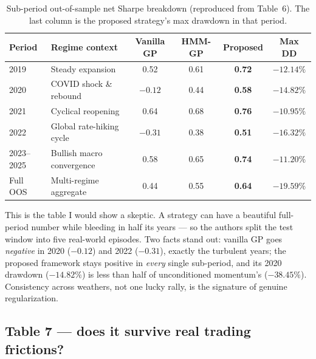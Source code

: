 \documentclass[11pt,a4paper]{article}
\begin{document}
\begin{table}[H]
\centering\small
\caption{Sub-period out-of-sample net Sharpe breakdown (reproduced from
Table~6). The last column is the proposed strategy's max drawdown in that
period.}
\label{tab:subperiod}
\begin{tabular}{@{}llcccc@{}}
\toprule
\textbf{Period} & \textbf{Regime context} & \textbf{Vanilla GP} &
\textbf{HMM-GP} & \textbf{Proposed} & \textbf{Max DD} \\
\midrule
2019        & Steady expansion          & 0.52 & 0.61 & \textbf{0.72} & $-12.14\%$ \\
2020        & COVID shock \& rebound    & $-0.12$ & 0.44 & \textbf{0.58} & $-14.82\%$ \\
2021        & Cyclical reopening        & 0.64 & 0.68 & \textbf{0.76} & $-10.95\%$ \\
2022        & Global rate-hiking cycle  & $-0.31$ & 0.38 & \textbf{0.51} & $-16.32\%$ \\
2023--2025  & Bullish macro convergence & 0.58 & 0.65 & \textbf{0.74} & $-11.20\%$ \\
\midrule
Full OOS    & Multi-regime aggregate    & 0.44 & 0.55 & \textbf{0.64} & $-19.59\%$ \\
\bottomrule
\end{tabular}
\end{table}

\begin{plaineng}
This is the table I would show a skeptic. A strategy can have a beautiful
full-period number while bleeding in half its years --- so the authors split
the test window into five real-world episodes. Two facts stand out:
vanilla GP goes \emph{negative} in 2020 ($-0.12$) and 2022 ($-0.31$), exactly
the turbulent years; the proposed framework stays positive in
\emph{every} single sub-period, and its 2020 drawdown ($-14.82\%$) is less
than half of unconditioned momentum's ($-38.45\%$). Consistency across
weathers, not one lucky rally, is the signature of genuine regularization.
\end{plaineng}

\subsection{Table 7 --- does it survive real trading frictions?}
\end{document}
